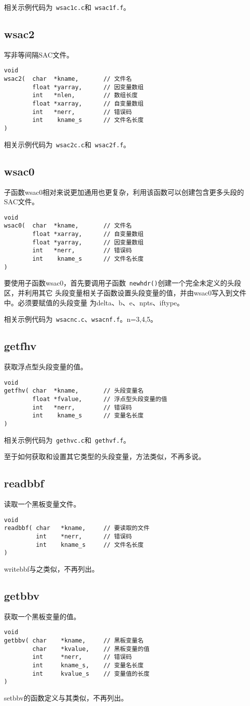 相关示例代码为~\verb+wsac1c.c+和~\verb+wsac1f.f+。

\subsection{wsac2}
写非等间隔SAC文件。

\begin{verbatim}
void
wsac2(  char  *kname,       // 文件名
        float *yarray,      // 因变量数组
        int   *nlen,        // 数组长度
        float *xarray,      // 自变量数组
        int   *nerr,        // 错误码
        int    kname_s      // 文件名长度
)
\end{verbatim}

相关示例代码为~\verb+wsac2c.c+和~\verb+wsac2f.f+。

\subsection{wsac0}
子函数wsac0相对来说更加通用也更复杂，利用该函数可以创建包含更多头段的SAC文件。

\begin{verbatim}
void
wsac0(  char  *kname,       // 文件名
        float *xarray,      // 自变量数组
        float *yarray,      // 因变量数组
        int   *nerr,        // 错误码
        int    kname_s      // 文件名长度
)
\end{verbatim}

要使用子函数wsac0，首先要调用子函数~\verb+newhdr()+创建一个完全未定义的头段区，并利用其它
头段变量相关子函数设置头段变量的值，并由wsac0写入到文件中。必须要赋值的头段变量
为delta、b、e、npts、iftype。

相关示例代码为~\verb+wsacnc.c+、\verb+wsacnf.f+。n=3,4,5。

\subsection{getfhv}
获取浮点型头段变量的值。
\begin{verbatim}
void
getfhv( char  *kname,       // 头段变量名
        float *fvalue,      // 浮点型头段变量的值
        int   *nerr,        // 错误码
        int    kname_s      // 变量名长度
)
\end{verbatim}

相关示例代码为~\verb+gethvc.c+和~\verb+gethvf.f+。

至于如何获取和设置其它类型的头段变量，方法类似，不再多说。

\subsection{readbbf}
读取一个黑板变量文件。
\begin{verbatim}
void
readbbf( char   *kname,     // 要读取的文件
         int    *nerr,      // 错误码
         int    kname_s     // 文件名长度
)
\end{verbatim}

writebbf与之类似，不再列出。

\subsection{getbbv}
获取一个黑板变量的值。
\begin{verbatim}
void
getbbv( char    *kname,     // 黑板变量名
        char    *kvalue,    // 黑板变量的值
        int     *nerr,      // 错误码
        int     kname_s,    // 变量名长度
        int     kvalue_s    // 变量值的长度
)
\end{verbatim}
setbbv的函数定义与其类似，不再列出。
